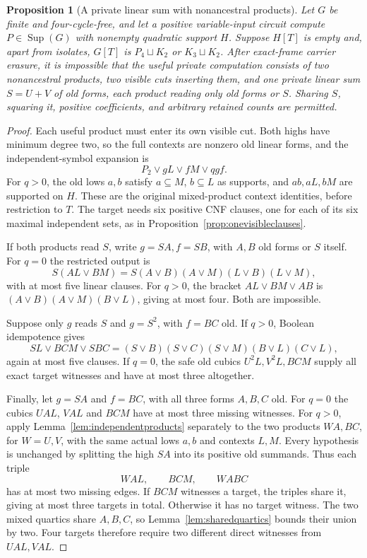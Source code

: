 \documentclass[11pt]{article}
\newcommand{\Sup}{\operatorname{Sup}}
\newtheorem{proposition}[theorem]{Proposition}
\theoremstyle{definition}
\theoremstyle{remark}
\begin{document}
\begin{proposition}[A private linear sum with nonancestral products]\label{prop:privatelinearindependent}
Let $G$ be finite and four-cycle-free, and let a positive variable-input circuit compute $P\in\Sup(G)$ with nonempty quadratic support $H$. Suppose $H[T]$ is empty and, apart from isolates, $G[T]$ is $P_4\sqcup K_2$ or $K_3\sqcup K_2$. After exact-frame carrier erasure, it is impossible that the useful private computation consists of two nonancestral products, two visible cuts inserting them, and one private linear sum $S=U+V$ of old forms, each product reading only old forms or $S$. Sharing $S$, squaring it, positive coefficients, and arbitrary retained counts are permitted.
\end{proposition}
\begin{proof}
Each useful product must enter its own visible cut. Both highs have minimum degree two, so the full contexts are nonzero old linear forms, and the independent-symbol expansion is
\[
 P_2\vee gL\vee fM\vee qgf.
\]
For $q>0$, the old lows $a,b$ satisfy $a\subseteq M$, $b\subseteq L$ as supports, and $ab,aL,bM$ are supported on $H$. These are the original mixed-product context identities, before restriction to $T$. The target needs six positive CNF clauses, one for each of its six maximal independent sets, as in Proposition~\ref{prop:onevisibleclauses}.

If both products read $S$, write $g=SA,f=SB$, with $A,B$ old forms or $S$ itself. For $q=0$ the restricted output is
\[
 S(AL\vee BM)=S(A\vee B)(A\vee M)(L\vee B)(L\vee M),
\]
with at most five linear clauses. For $q>0$, the bracket $AL\vee BM\vee AB$ is $(A\vee B)(A\vee M)(B\vee L)$, giving at most four. Both are impossible.

Suppose only $g$ reads $S$ and $g=S^2$, with $f=BC$ old. If $q>0$, Boolean idempotence gives
\[
 SL\vee BCM\vee SBC
 =(S\vee B)(S\vee C)(S\vee M)(B\vee L)(C\vee L),
\]
again at most five clauses. If $q=0$, the safe old cubics $U^2L,V^2L,BCM$ supply all exact target witnesses and have at most three altogether.

Finally, let $g=SA$ and $f=BC$, with all three forms $A,B,C$ old. For $q=0$ the cubics $UAL$, $VAL$ and $BCM$ have at most three missing witnesses. For $q>0$, apply Lemma~\ref{lem:independentproducts} separately to the two products $WA,BC$, for $W=U,V$, with the same actual lows $a,b$ and contexts $L,M$. Every hypothesis is unchanged by splitting the high $SA$ into its positive old summands. Thus each triple
\[
 WAL,\qquad BCM,\qquad WABC
\]
has at most two missing edges. If $BCM$ witnesses a target, the triples share it, giving at most three targets in total. Otherwise it has no target witness. The two mixed quartics share $A,B,C$, so Lemma~\ref{lem:sharedquartics} bounds their union by two. Four targets therefore require two different direct witnesses from $UAL,VAL$.


\end{proof}
\end{document}
